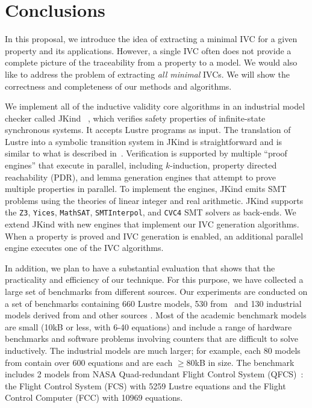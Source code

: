 \chapter{Conclusions}

In this proposal, we introduce the idea of extracting a minimal IVC for a given property and its applications.  However, a single IVC often does not provide a complete picture of the traceability from a property to a model.  We would also like to address the problem of extracting {\em all minimal} IVCs.
We will show
the correctness and completeness of our methods and algorithms.

We implement all of the inductive validity core algorithms in an industrial model checker called JKind ~\cite{jkind},
which verifies safety properties of infinite-state synchronous systems.
It accepts Lustre programs \cite{Halbwachs91:lustre} as input.  The translation of Lustre
into a symbolic transition system in JKind is straightforward and is similar to what is described
in~\cite{Hagen08:FMCAD}.
Verification is supported by multiple ``proof engines'' that execute in parallel, including $k$-induction,
property directed reachability (PDR), and lemma generation engines that attempt to prove
multiple properties in parallel.  To implement the engines,
JKind emits SMT problems using the theories of linear integer and real arithmetic. JKind supports the \texttt{Z3}, \texttt{Yices}, \texttt{MathSAT}, \texttt{SMTInterpol}, and \texttt{CVC4} SMT solvers as back-ends.  We extend JKind with new engines that implement our IVC generation algorithms. When a property is
proved and IVC generation is enabled, an additional parallel engine
executes one of the IVC algorithms.


In addition, we plan to have a substantial evaluation that shows that the practicality and efficiency of our technique. For this purpose, we have collected a large set of benchmarks from different sources. Our experiments are conducted on a set of benchmarks containing 660 Lustre models, 530 from~\cite{Hagen08:FMCAD, piskac2016} and 130 industrial models derived from \cite{hilt2013} and other sources \cite{piskac2016, NFM2015:backes}.  Most of the academic benchmark models are small (10kB or less, with 6-40 equations) and include a range of hardware benchmarks and software problems involving counters that are difficult to solve inductively.
The industrial models are much larger; for example, each 80 models from \cite{hilt2013} contain over 600 equations and are each $\geq$80kB in size. The benchmark includes 2 models from NASA Quad-redundant Flight Control System (QFCS)~\cite{NFM2015:backes}: the Flight Control System (FCS) with 5259 Lustre equations and the Flight Control Computer (FCC) with 10969 equations.

